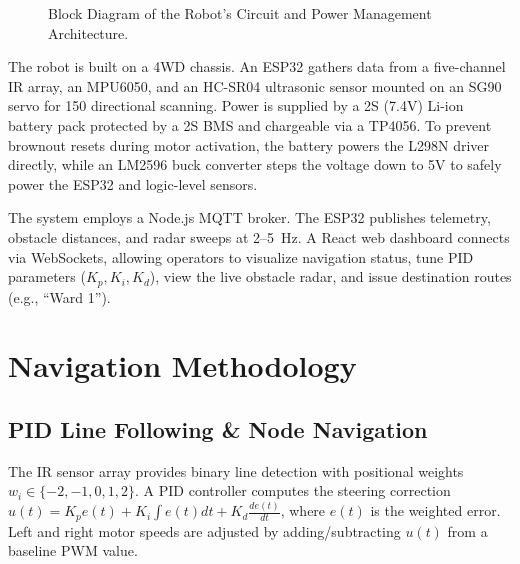 \documentclass[conference]{IEEEtran}
\begin{document}
\begin{figure}[ht]
{
}
\caption{Block Diagram of the Robot's Circuit and Power Management Architecture.}
\label{fig:circuit}
\end{figure}

The robot is built on a 4WD chassis. An ESP32 gathers data from a five-channel IR array, an MPU6050, and an HC-SR04 ultrasonic sensor mounted on an SG90 servo for 150\textdegree{} directional scanning. Power is supplied by a 2S (7.4V) Li-ion battery pack protected by a 2S BMS and chargeable via a TP4056. To prevent brownout resets during motor activation, the battery powers the L298N driver directly, while an LM2596 buck converter steps the voltage down to 5V to safely power the ESP32 and logic-level sensors.

The system employs a Node.js MQTT broker. The ESP32 publishes telemetry, obstacle distances, and radar sweeps at 2--5~Hz. A React web dashboard connects via WebSockets, allowing operators to visualize navigation status, tune PID parameters ($K_p, K_i, K_d$), view the live obstacle radar, and issue destination routes (e.g., ``Ward 1'').

\section{Navigation Methodology}

\subsection{PID Line Following \& Node Navigation}
The IR sensor array provides binary line detection with positional weights $w_i \in \{-2, -1, 0, 1, 2\}$. A PID controller computes the steering correction $u(t) = K_p e(t) + K_i \int e(t) dt + K_d \frac{de(t)}{dt}$, where $e(t)$ is the weighted error. Left and right motor speeds are adjusted by adding/subtracting $u(t)$ from a baseline PWM value.
\end{document}
